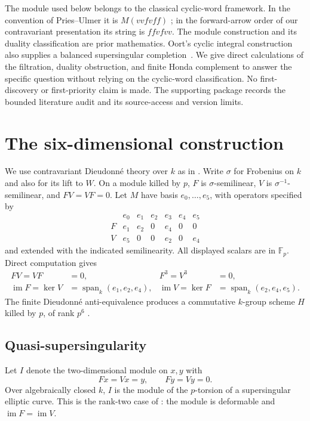 \documentclass[10pt]{article}
\newcommand{\im}{\operatorname{im}}
\newcommand{\Span}{\operatorname{span}}
\begin{document}
The module used below belongs to the classical cyclic-word framework.
In the convention of Pries--Ulmer it is $M(vvfvff)$
\cite[\S\S3.2.1,4.1]{PriesUlmer}; in the forward-arrow order of our
contravariant presentation its string is $ffvfvv$.
The module construction and its duality classification are prior
mathematics. Oort's cyclic integral construction also supplies a
balanced supersingular completion~\cite[\S\S2.5--2.6]{Oort}.
We give direct calculations of the filtration, duality obstruction,
and finite Honda complement to answer the specific question without
relying on the cyclic-word classification. No first-discovery or
first-priority claim is made. The supporting package records the
bounded literature audit and its source-access and version limits.

\section{The six-dimensional construction}
We use contravariant Dieudonn\'e theory over $k$ as in
\cite[\S2]{Hoshi}. Write $\sigma$ for Frobenius on $k$ and also for
its lift to $W$. On a module killed by $p$, $F$ is
$\sigma$-semilinear, $V$ is $\sigma^{-1}$-semilinear, and $FV=VF=0$.
Let $M$ have basis $e_0,\ldots,e_5$, with operators specified by
\[
\begin{array}{c|rrrrrr}
 &e_0&e_1&e_2&e_3&e_4&e_5\\\hline
F&e_1&e_2&0&e_4&0&0\\
V&e_5&0&0&e_2&0&e_4
\end{array}
\]
and extended with the indicated semilinearity. All displayed scalars
are in $\mathbb F_p$. Direct computation gives
\begin{align*}
 FV=VF&=0,& F^3=V^3&=0,\\
 \im F=\ker V&=\Span_k(e_1,e_2,e_4),&
 \im V=\ker F&=\Span_k(e_2,e_4,e_5).
\end{align*}
The finite Dieudonn\'e anti-equivalence produces a commutative
$k$-group scheme $H$ killed by $p$, of rank $p^6$
\cite[Proposition~2.5]{Hoshi}.

\subsection{Quasi-supersingularity}
Let $I$ denote the two-dimensional module on $x,y$ with
\[
 Fx=Vx=y,\qquad Fy=Vy=0.
\]
Over algebraically closed $k$, $I$ is the module of the $p$-torsion
of a supersingular elliptic curve. This is the rank-two case of
\cite[Lemma~4.9]{Hoshi}: the module is deformable and
$\im F=\im V$.
\end{document}

